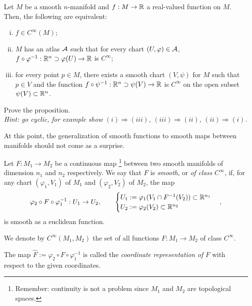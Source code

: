 \begin{proposition}
  Let $M$ be a smooth $n$-manifold and $f:M\to\mathbb{R}$ a real-valued function on $M$. Then, the following are equivalent:
  \begin{enumerate}[(i)]
    \item $f\in C^\infty(M)$;
    \item $M$ has an atlas $\mathcal{A}$ such that for every chart $(U, \varphi)\in\mathcal{A}$, $f\circ \varphi^{-1} : \mathbb{R}^n\supset\varphi(U)\to \mathbb{R}$ is $C^\infty$;
    \item for every point $p\in M$, there exists a smooth chart $(V,\psi)$ for $M$ such that $p\in V$ and the function $f\circ\psi^{-1} : \mathbb{R}^n\supset\psi(V)\to \mathbb{R}$ is $C^\infty$ on the open subset $\psi(V)\subset\mathbb{R}^n$.
  \end{enumerate}
\end{proposition}

\begin{exercise}
  Prove the proposition.\\
  \textit{\small Hint: go cyclic, for example show $(i)\Rightarrow(iii)$, $(iii)\Rightarrow(ii)$, $(ii)\Rightarrow(i)$.}
\end{exercise}

At this point, the generalization of smooth functions to smooth maps between manifolds should not come as a surprise.

\begin{definition}
  Let $F:M_1\to M_2$ be a continuous map \footnote{Remember: continuity is not a problem since $M_1$ and $M_2$ are topological spaces.} between two smooth manifolds of dimension $n_1$ and $n_2$ respectively.
  We say that $F$ is \emph{smooth}, or \emph{of class $C^\infty$}, if, for any chart $(\varphi_1, V_1)$ of $M_1$ and $(\varphi_2, V_2)$ of $M_2$, the map
  \begin{align}
    \varphi_2 \circ F \circ \varphi_1^{-1}: U_1 \to U_2,\qquad
    \begin{cases}
      U_1 := \varphi_1(V_1 \cap F^{-1}(V_2))\subset\mathbb{R}^{n_1} \\
      U_2 := \varphi_2(V_2)\subset\mathbb{R}^{n_2}
    \end{cases},
  \end{align}
  is smooth as a euclidean function.

  We denote by $C^\infty(M_1, M_2)$ the set of all functions $F:M_1\to M_2$ of class $C^\infty$.

  The map $\hat F := \varphi_2 \circ F \circ \varphi_1^{-1}$ is called the \emph{coordinate representation of $F$} with respect to the given coordinates.
\end{definition}


